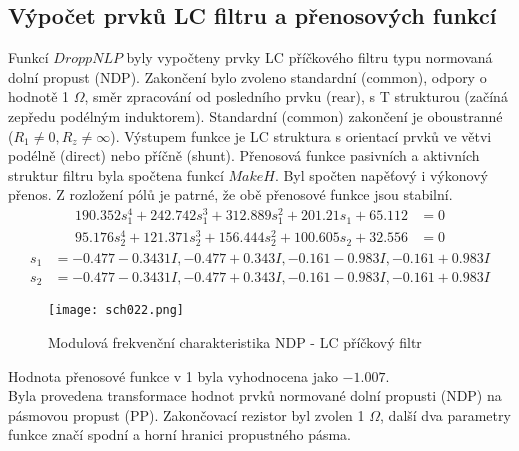 \subsection{Výpočet prvků LC filtru a přenosových funkcí}\label{s:VYP}
\noindent Funkcí $DroppNLP$ byly vypočteny prvky LC příčkového filtru typu normovaná dolní propust (NDP). Zakončení bylo zvoleno standardní (common), odpory o hodnotě 1 $\Omega$, směr zpracování od posledního prvku (rear), s T strukturou (začíná zepředu podélným induktorem). Standardní (common) zakončení je oboustranné ($R_1 \neq 0, R_z \neq \infty$). Výstupem funkce je LC struktura s orientací prvků ve větvi podélně (direct) nebo příčně (shunt).
\noindent Přenosová funkce pasivních a aktivních struktur filtru byla spočtena funkcí $MakeH$. Byl spočten  napěťový i výkonový přenos. Z rozložení pólů je patrné, že obě přenosové funkce jsou stabilní.
\begin{align}
190.352s_1^4 + 242.742s_1^3 + 312.889s_1^2 + 201.21s_1 + 65.112 &= 0 \\
95.176s_2^4 + 121.371s_2^3 + 156.444s_2^2 + 100.605s_2 + 32.556 &= 0
\end{align}
\begin{align}
s_1 &= {-0.477 - 0.3431 I}, {-0.477 + 0.343 I}, {-0.161 - 0.983 I}, {-0.161 + 0.983 I}\\
s_2 &= {-0.477 - 0.3431 I}, {-0.477 + 0.343 I}, {-0.161 - 0.983 I}, {-0.161+ 0.983 I}
\end{align}
\begin{figure}[h]
\centering
\texttt{[image: sch022.png]}
\caption{Modulová frekvenční charakteristika NDP - LC příčkový filtr}
\end{figure}
\noindent Hodnota přenosové funkce v 1 byla vyhodnocena jako $-1.007$.\\
Byla provedena transformace hodnot prvků normované dolní propusti (NDP) na pásmovou propust (PP). Zakončovací rezistor byl zvolen 1 $\Omega$, další dva parametry funkce značí spodní a horní hranici propustného pásma.
